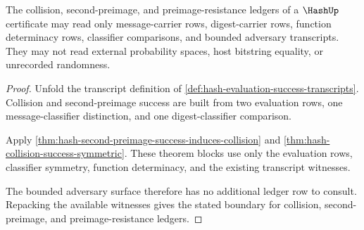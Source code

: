 \begin{theorem}
\label{thm:hash-collision-ledger-boundary}
The collision, second-preimage, and preimage-resistance ledgers of a $\HashUp$ certificate may read only message-carrier rows, digest-carrier rows, function determinacy rows, classifier comparisons, and bounded adversary transcripts. They may not read external probability spaces, host bitstring equality, or unrecorded randomness.
\end{theorem}
\begin{proof}
Unfold the transcript definition of \autoref{def:hash-evaluation-success-transcripts}. Collision and second-preimage success are built from two evaluation rows, one message-classifier distinction, and one digest-classifier comparison.

Apply \autoref{thm:hash-second-preimage-success-induces-collision} and \autoref{thm:hash-collision-success-symmetric}. These theorem blocks use only the evaluation rows, classifier symmetry, function determinacy, and the existing transcript witnesses.

The bounded adversary surface therefore has no additional ledger row to consult. Repacking the available witnesses gives the stated boundary for collision, second-preimage, and preimage-resistance ledgers.
\end{proof}

